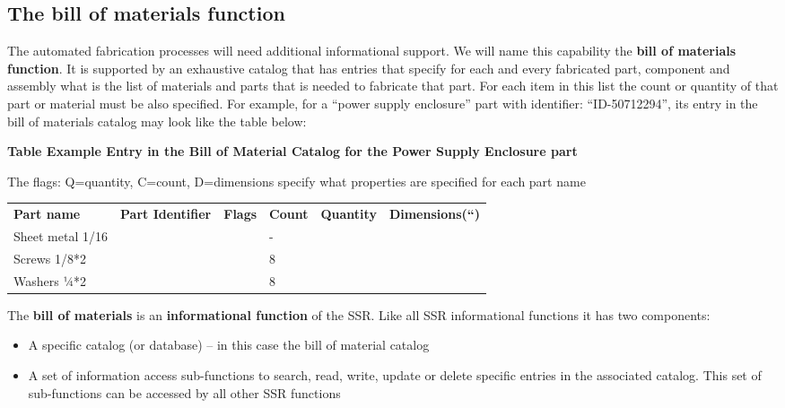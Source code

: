 \documentclass[letterpaper]{article}
\begin{document}
\bigskip

\subsection[The bill of materials function]{The bill of materials
function}
\hypertarget{RefHeading3062306210128}{}The automated fabrication
processes will need additional informational support. We will name this
capability the \textbf{bill of materials function}. It is supported by
an exhaustive catalog that has entries that specify for each and every
fabricated part, component and assembly what is the list of materials
and parts that is needed to fabricate that part. For each item in this
list the count or quantity of that part or material must be also
specified. For example, for a “power supply enclosure” part with
identifier:  “ID-50712294”, its entry in the bill of materials catalog
may look like the table below:


\bigskip

{\bfseries
Table  Example Entry in the Bill of Material Catalog for the
{\textquotedbl}Power Supply Enclosure{\textquotedbl} part}

The flags: Q=quantity, C=count, D=dimensions specify what properties are
specified for each part name


\bigskip

\begin{flushleft}
\tablehead{}
\begin{supertabular}{|m{1.3094599in}m{1.3573599in}m{0.9837598in}m{0.6705598in}m{0.82335985in}m{1.0323598in}|}
\hline
\textbf{Part name} &
\textbf{Part Identifier} &
\textbf{Flags} &
\textbf{Count} &
\textbf{Quantity} &
\textbf{Dimensions(“)}\\
Sheet metal  1/16 &
~
 &
~
 &
{}- &
~
 &
~
\\
Screws 1/8*2 &
~
 &
~
 &
8 &
~
 &
~
\\
Washers  ¼*2 &
~
 &
~
 &
8 &
~
 &
~
\\\hline
\end{supertabular}
\end{flushleft}

\bigskip

The \textbf{bill of materials} is an \textbf{informational function} of
the SSR. Like all SSR informational functions it has two components:


\bigskip

\begin{itemize}
\item A specific catalog (or database) – in this case the bill of
material catalog
\item A set of information access sub-functions to search, read, write,
update or delete specific entries in the associated catalog. This set
of sub-functions can be accessed by all other SSR functions 
\end{itemize}
\end{document}
